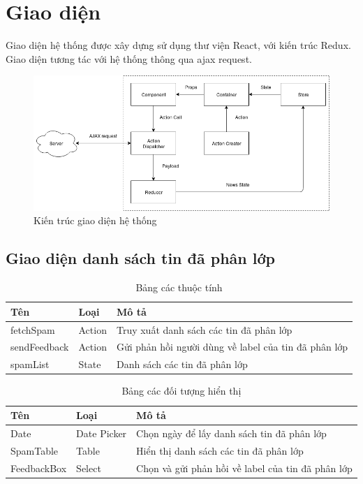 \section{Giao diện}
Giao diện hệ thống được xây dựng sử dụng thư viện React, với kiến trúc Redux. Giao diện tương tác với hệ thống thông qua ajax request.
	\begin{figure}[H]
		\centering
		\includegraphics[width=1\linewidth]{Chapter3/Chapter3Figs/FrontEndArch}
		\caption{Kiến trúc giao diện hệ thống}
		\label{fig:layers}
	\end{figure}

  \subsection{Giao diện danh sách tin đã phân lớp}
  \begin{table}[H]
    \centering
    \setlength{\tabcolstep}{12pt}
    \begin{tabular}{@{}lll@{}} \toprule
      Tên  & Loại   & Mô tả \\ \midrule
      fetchSpam &  Action   & Truy xuất danh sách các tin đã phân lớp \\
      sendFeedback & Action & Gửi phản hồi người dùng về label của tin đã phân lớp \\
      spamList     & State       & Danh sách các tin đã phân lớp  \\ \bottomrule
    \end{tabular}
    \caption{Bảng các thuộc tính}
  \end{table}

  \begin{table}[H]
    \centering
    \setlength{\tabcolstep}{12pt}
    \begin{tabular}{@{}lll@{}} \toprule
      Tên  & Loại   & Mô tả \\ \midrule
      Date  &  Date Picker & Chọn ngày để lấy danh sách tin đã phân lớp \\
      SpamTable  & Table & Hiển thị danh sách các tin đã phân lớp \\
      FeedbackBox & Select & Chọn và gửi phản hồi về label của tin đã phân lớp \\ \bottomrule
    \end{tabular}
    \caption{Bảng các đối tượng hiển thị}
  \end{table}

